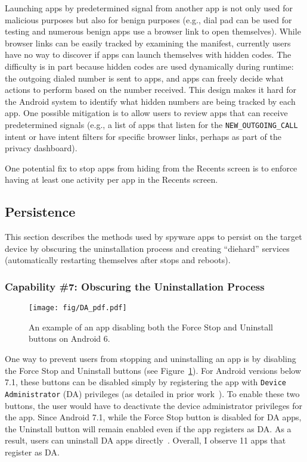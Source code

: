 Launching apps by predetermined signal from another app is not only used for
malicious purposes but also for benign purposes (e.g., dial pad can be used for
testing and numerous benign apps use a browser link to open themselves).
While browser links can be easily tracked by examining the manifest, currently
users have no way to discover if apps can launch themselves with hidden codes.
The difficulty is in part because hidden codes are used dynamically during
runtime: the outgoing dialed number is sent to apps, and apps can freely decide
what actions to perform based on the number received. This design makes it hard
for the Android system to identify what hidden numbers are being tracked by each
app.  One possible mitigation is to allow users to review apps that can receive predetermined signals (e.g., a list of apps that listen for the
\texttt{NEW\_OUTGOING\_CALL} intent or have intent filters for specific browser links,
perhaps as part of the privacy dashboard).

One potential fix to stop apps from hiding from the Recents screen is to enforce
having at least one activity per app in the Recents screen.




\subsection{Persistence}
\label{subsec:persistence}
This section describes the methods used by spyware apps to persist on the target
device by obscuring the uninstallation process and creating ``diehard'' services
(automatically restarting themselves after stops and reboots).


\subsubsection*{Capability \#7: Obscuring the Uninstallation Process}
\begin{figure}[t]
\centering
\texttt{[image: fig/DA\_pdf.pdf]}
\caption[Disabling Uninstall Buttons Example]{An example of an app disabling both the
Force Stop and Uninstall buttons on Android 6.}
\label{fig:da}
\end{figure}
One way to prevent users from stopping and uninstalling an app is by
disabling the Force Stop and Uninstall buttons (see
Figure~\ref{fig:da}).  For Android versions below 7.1,
these buttons can be disabled simply by registering the app with
\texttt{Device Administrator} (DA) privileges (as detailed in prior
work~\cite{shan2019device}). To enable these two buttons, the user
would have to deactivate the device administrator privileges for the
app.
%
Since Android 7.1, while the Force Stop button is disabled for DA
apps, the Uninstall button will remain enabled even if the app
registers as DA.  As a result, users can uninstall DA apps
directly~\cite{shan2019device}. Overall, I observe 11 apps that
register as DA.

